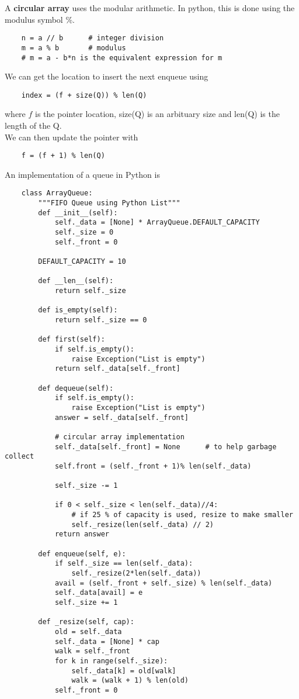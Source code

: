 \documentclass[]{article}
\begin{document}
A \textbf{circular array} uses the modular arithmetic. In python, this is done using the modulus symbol \%.\\

\begin{lstlisting}
	n = a // b 		# integer division
	m = a % b 		# modulus
	# m = a - b*n is the equivalent expression for m
\end{lstlisting}\bigbreak

We can get the location to insert the next enqueue using

\begin{lstlisting}
	index = (f + size(Q)) % len(Q)
\end{lstlisting}\bigbreak

where $f$ is the pointer location, size(Q) is an arbituary size and len(Q) is the length of the Q.\\

We can then update the pointer with

\begin{lstlisting}
	f = (f + 1) % len(Q)
\end{lstlisting}\bigbreak

An implementation of a queue in Python is

\begin{lstlisting}
	class ArrayQueue:
		"""FIFO Queue using Python List"""
		def __init__(self):
			self._data = [None] * ArrayQueue.DEFAULT_CAPACITY
			self._size = 0
			self._front = 0
			
		DEFAULT_CAPACITY = 10
		
		def __len__(self):
			return self._size
			
		def is_empty(self):
			return self._size == 0
			
		def first(self):
			if self.is_empty():
				raise Exception("List is empty")
			return self._data[self._front]
		
		def dequeue(self):
			if self.is_empty():
				raise Exception("List is empty")
			answer = self._data[self._front]
			
			# circular array implementation
			self._data[self._front] = None 		# to help garbage collect
			self.front = (self._front + 1)% len(self._data)
			
			self._size -= 1
			
			if 0 < self._size < len(self._data)//4:
				# if 25 % of capacity is used, resize to make smaller
				self._resize(len(self._data) // 2)
			return answer
		
		def enqueue(self, e):
			if self._size == len(self._data):
				self._resize(2*len(self._data))
			avail = (self._front + self._size) % len(self._data)
			self._data[avail] = e
			self._size += 1
		
		def _resize(self, cap):
			old = self._data
			self._data = [None] * cap
			walk = self._front
			for k in range(self._size):
				self._data[k] = old[walk]
				walk = (walk + 1) % len(old)
			self._front = 0
\end{lstlisting}\bigbreak 
\end{document}
